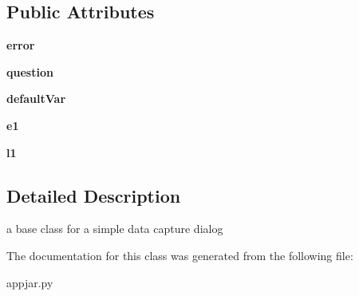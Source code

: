 \subsection*{Public Attributes}
\begin{DoxyCompactItemize}
\item 
\mbox{\label{class_python_01_g_u_i_1_1appjar_1_1_simple_entry_dialog_ab0bfb63ea979cd93afe884034994e915}} 
{\bfseries error}
\item 
\mbox{\label{class_python_01_g_u_i_1_1appjar_1_1_simple_entry_dialog_ac49b69e29ffd910481e13efab5b6107e}} 
{\bfseries question}
\item 
\mbox{\label{class_python_01_g_u_i_1_1appjar_1_1_simple_entry_dialog_a949c2a44d30f7850320a820c9fa902cc}} 
{\bfseries default\+Var}
\item 
\mbox{\label{class_python_01_g_u_i_1_1appjar_1_1_simple_entry_dialog_a8d89d7e720d4107a88cf4772ab6c7b62}} 
{\bfseries e1}
\item 
\mbox{\label{class_python_01_g_u_i_1_1appjar_1_1_simple_entry_dialog_a0ab41f1a675da9ea12ae2f3980f37d38}} 
{\bfseries l1}
\end{DoxyCompactItemize}


\subsection{Detailed Description}
\begin{DoxyVerb}a base class for a simple data capture dialog \end{DoxyVerb}
 

The documentation for this class was generated from the following file\+:\begin{DoxyCompactItemize}
\item 
appjar.\+py\end{DoxyCompactItemize}
